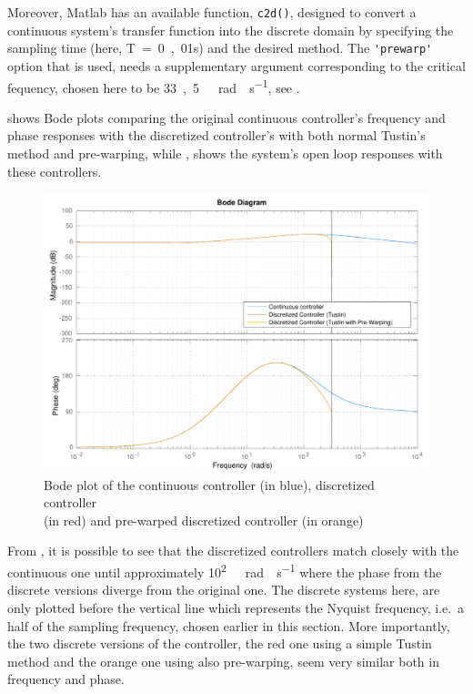Moreover, Matlab has an available function, \lstinline{c2d()}, designed to convert a continuous system's transfer function into the discrete domain by specifying the sampling time (here, \si{T = 0,01s}) and the desired method. The \lstinline{'prewarp'} option that is used, needs a supplementary argument corresponding to the critical fequency, chosen here to be \si{33,5\ rad \cdot s^{-1}}, see \cite{Matlabc2d}.

 shows Bode plots comparing the original continuous controller's frequency and phase responses with the discretized controller's with both normal Tustin's method and pre-warping, while , shows the system's open loop responses with these controllers.\\ 
% 
\begin{figure}[H]
  \centering
  \includegraphics[scale=0.6]{figures/prewarpVsNoPrewarpVsContinuousBode.pdf}
  \caption{Bode plot of the continuous controller (in blue), discretized controller\\(in red) and pre-warped discretized controller (in orange)}
  \label{fig:bodePrewarpVsNoPrewarpVsContinuous}
\end{figure}
%
From , it is possible to see that the discretized controllers match closely with the continuous one until approximately \si{10^{2}\ rad \cdot s^{-1}} where the phase from the discrete versions diverge from the original one. The discrete systems here, are only plotted before the vertical line which represents the Nyquist frequency, i.e.~a half of the sampling frequency, chosen earlier in this section. More importantly, the two discrete versions of the controller, the red one using a simple Tustin method and the orange one using also pre-warping, seem very similar both in frequency and phase.
